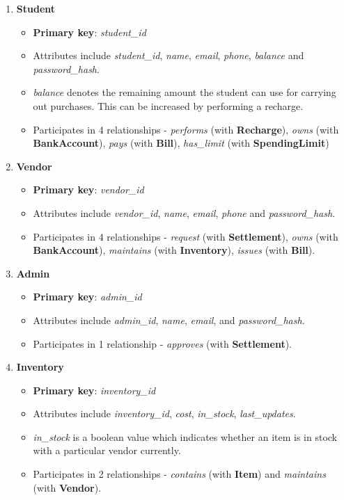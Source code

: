 \documentclass[a4paper,12pt]{article}
\begin{document}
\begin{enumerate}
    \item \textbf{Student}
    \begin{itemize}
        \item \textbf{Primary key}: \textit{student\_id}
        \item Attributes include \textit{student\_id}, \textit{name}, \textit{email}, \textit{phone}, \textit{balance} and \textit{password\_hash}.
        \item \textit{balance} denotes the remaining amount the student can use for carrying out purchases. This can be increased by performing a recharge.
        \item Participates in 4 relationships - \textit{performs} (with \textbf{Recharge}), \textit{owns} (with \textbf{BankAccount}), \textit{pays} (with \textbf{Bill}), \textit{has\_limit} (with \textbf{SpendingLimit})
    \end{itemize}
    
    \item \textbf{Vendor}
    \begin{itemize}
        \item \textbf{Primary key}: \textit{vendor\_id}
        \item Attributes include \textit{vendor\_id}, \textit{name}, \textit{email}, \textit{phone} and \textit{password\_hash}.
        \item Participates in 4 relationships - \textit{request} (with \textbf{Settlement}), \textit{owns} (with \textbf{BankAccount}), \textit{maintains} (with \textbf{Inventory}), \textit{issues} (with \textbf{Bill}).
    \end{itemize}
    
    \item \textbf{Admin}
    \begin{itemize}
        \item \textbf{Primary key}: \textit{admin\_id}
        \item Attributes include \textit{admin\_id}, \textit{name}, \textit{email},  and \textit{password\_hash}.
        \item Participates in 1 relationship - \textit{approves} (with \textbf{Settlement}).
    \end{itemize}
    
    \item \textbf{Inventory}
    \begin{itemize}
        \item \textbf{Primary key}: \textit{inventory\_id}
        \item Attributes include \textit{inventory\_id}, \textit{cost}, \textit{in\_stock}, \textit{last\_updates}.
        \item \textit{in\_stock} is a boolean value which indicates whether an item is in stock with a particular vendor currently.
        \item Participates in 2 relationships - \textit{contains} (with \textbf{Item}) and \textit{maintains} (with \textbf{Vendor}).
    \end{itemize}
    

\end{enumerate}
\end{document}
